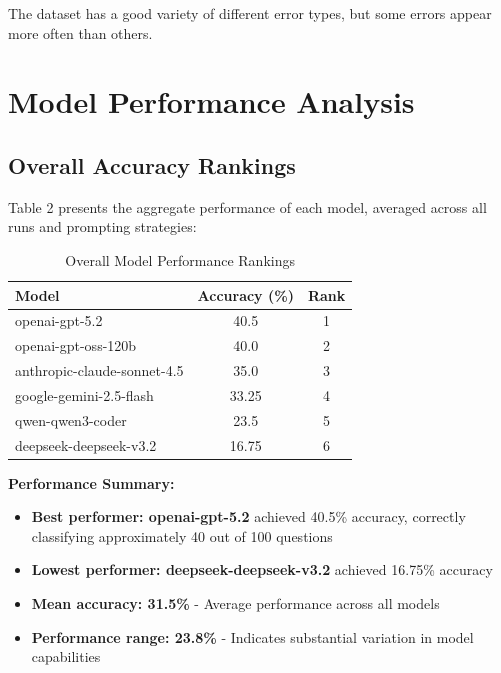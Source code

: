 \documentclass[12pt,a4paper]{article}
\begin{document}
The dataset has a good variety of different error types, but some errors appear more often than others.

\newpage

\section{Model Performance Analysis}

\subsection{Overall Accuracy Rankings}

Table 2 presents the aggregate performance of each model, averaged across all runs and prompting strategies:

\begin{table}[H]
\centering
\begin{tabular}{lcc}
\toprule
\textbf{Model} & \textbf{Accuracy (\%)} & \textbf{Rank} \\
\midrule
openai-gpt-5.2 & 40.5 & 1 \\
openai-gpt-oss-120b & 40.0 & 2 \\
anthropic-claude-sonnet-4.5 & 35.0 & 3 \\
google-gemini-2.5-flash & 33.25 & 4 \\
qwen-qwen3-coder & 23.5 & 5 \\
deepseek-deepseek-v3.2 & 16.75 & 6 \\
\bottomrule
\end{tabular}
\caption{Overall Model Performance Rankings}
\end{table}

\textbf{Performance Summary:}

\begin{itemize}[leftmargin=*]
    \item \textbf{Best performer: openai-gpt-5.2} achieved 40.5\% accuracy, correctly classifying approximately 40 out of 100 questions
    
    \item \textbf{Lowest performer: deepseek-deepseek-v3.2} achieved 16.75\% accuracy
    
    \item \textbf{Mean accuracy: 31.5\%} - Average performance across all models
    
    \item \textbf{Performance range: 23.8\%} - Indicates substantial variation in model capabilities
\end{itemize}
\end{document}
